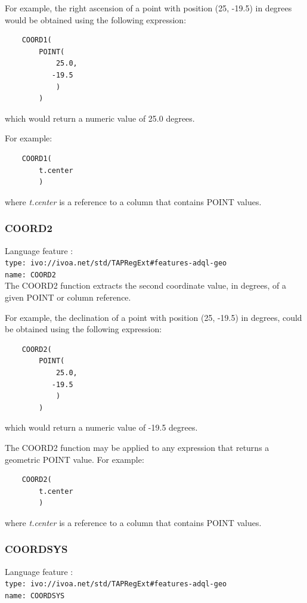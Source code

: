 \documentclass[11pt,a4paper]{ivoa}
\begin{document}
For example, the right ascension of a point with position (25, -19.5) in
degrees would be obtained using the following expression:
\begin{verbatim}
    COORD1(
        POINT(
            25.0,
           -19.5
            )
        )
\end{verbatim}
\noindent
which would return a numeric value of 25.0 degrees.

For example:
\begin{verbatim}
    COORD1(
        t.center
        )
\end{verbatim}
\noindent
where \textit{t.center} is a reference to a column that contains POINT values.

\subsubsection{COORD2}
\label{sec:functions.geom.coord2}
{\footnotesize Language feature :}\\
{\footnotesize \verb|type: ivo://ivoa.net/std/TAPRegExt#features-adql-geo|}\\
{\footnotesize \verb|name: COORD2|}\\

The COORD2 function extracts the second coordinate value, in degrees, of a given
POINT  or column reference.

For example, the declination of a point with position (25, -19.5) in degrees,
could be obtained using the following expression:
\begin{verbatim}
    COORD2(
        POINT(
            25.0,
           -19.5
            )
        )
\end{verbatim}
\noindent
which would return a numeric value of -19.5 degrees.

The COORD2 function may be applied to any expression that returns a
geometric POINT value.
For example:
\begin{verbatim}
    COORD2(
        t.center
        )
\end{verbatim}
\noindent
where \textit{t.center} is a reference to a column that contains POINT values.

\subsubsection{COORDSYS}
\label{sec:functions.geom.coordsys}
{\footnotesize Language feature :}\\
{\footnotesize \verb|type: ivo://ivoa.net/std/TAPRegExt#features-adql-geo|}\\
{\footnotesize \verb|name: COORDSYS|}\\
\end{document}
